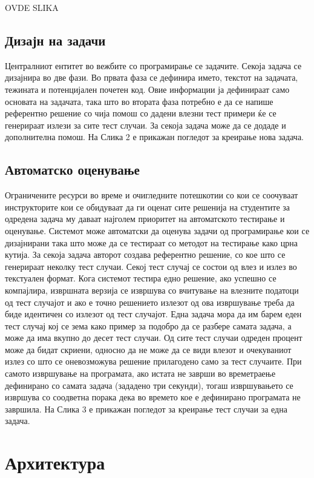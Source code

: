 \documentclass[a4paper,twocolumn]{article}
\begin{document}
OVDE SLIKA

\subsection{Дизајн на задачи}

Централниот ентитет во вежбите со програмирање се задачите. Секоја задача се
дизајнира во две фази. Во првата фаза се дефинира името, текстот на задачата,
тежината и потенцијален почетен код. Овие информации ја дефинираат само основата
на задачата, така што во втората фаза потребно е да се напише референтно решение
со чија помош со дадени влезни тест примери ќе се генерираат излези за сите тест
случаи. За секоја задача може да се додаде и дополнителна помош. На Слика 2 е
прикажан погледот за креирање нова задача.

\subsection{Автоматско оценување}

Ограничените ресурси во време и очигледните потешкотии со кои се соочуваат
инструкторите кои се обидуваат да ги оценат сите решенија на студентите за
одредена задача му даваат најголем приоритет на автоматското тестирање и
оценување. Системот може автоматски да оценува задачи од програмирање кои се
дизајнирани така што може да се тестираат со методот на тестирање како црна
кутија. За секоја задача авторот создава референтно решение, со кое што се
генерираат неколку тест случаи. Секој тест случај се состои од влез и излез во
текстуален формат. Кога системот тестира едно решение, ако успешно се
компајлира, извршната верзија се извршува со вчитување на влезните податоци од
тест случајот и ако е точно решението излезот од ова извршување треба да биде
идентичен со излезот од тест случајот. Една задача мора да им барем еден тест
случај кој се зема како пример за подобро да се разбере самата задача, а може да
има вкупно до десет тест случаи. Од сите тест случаи одреден процент може да
бидат скриени, односно да не може да се види влезот и очекуваниот излез со што
се оневозможува решение прилагодено само за тест случаите. При самото извршување
на програмата, ако истата не заврши во времетраење дефинирано со самата задача
(зададено три секунди), тогаш извршувањето се извршува со соодветна порака дека
во времето кое е дефинирано програмата не завршила. На Слика 3 е прикажан
погледот за креирање тест случаи за една задача.

\section{Архитектура}
\end{document}
